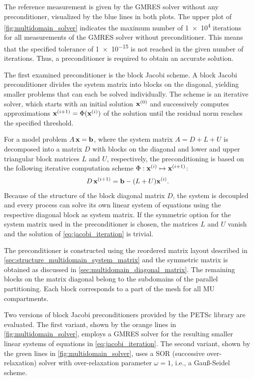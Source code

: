 The reference measurement is given by the GMRES solver without any preconditioner, visualized by the blue lines in both plots.
The upper plot of \cref{fig:multidomain_solver} indicates the maximum number of \num{1e4} iterations for all measurements of the GMRES solver without preconditioner. This means that the specified tolerance of \num{1e-15} is not reached in the given number of iterations. Thus, a preconditioner is required to obtain an accurate solution.

The first examined preconditioner is the block Jacobi scheme.
A block Jacobi preconditioner divides the system matrix into blocks on the diagonal, yielding smaller problems that can each be solved individually.
The scheme is an iterative solver, which starts with an initial solution $\textbf{x}^{(0)}$ and successively computes  approximations $\textbf{x}^{(i+1)} = \Phi(\textbf{x}^{(i)})$ of the solution until the residual norm reaches the specified threshold.

For a model problem $A\,\textbf{x} = \textbf{b}$, where the system matrix $A=D+L+U$ is decomposed into a matrix $D$ with blocks on the diagonal and lower and upper triangular block matrices $L$ and $U$, respectively, the preconditioning is based on the following iterative computation scheme $\Phi: \textbf{x}^{(i)} \mapsto \textbf{x}^{(i+1)}$:
\begin{align}\label{eq:jacobi_iteration}
  D\,\textbf{x}^{(i+1)} = \textbf{b} - (L+U)\textbf{x}^{(i)}.
\end{align}
Because of the structure of the block diagonal matrix $D$, the system is decoupled and every process can solve its own linear system of equations using the respective diagonal block as system matrix. If the symmetric option for the system matrix used in the preconditioner is chosen, the matrices $L$ and $U$ vanish and the solution of \cref{eq:jacobi_iteration} is trivial.

The preconditioner is constructed using the reordered matrix layout described in \cref{sec:structure_multidomain_system_matrix} and the symmetric matrix is obtained as discussed in \cref{sec:multidomain_diagonal_matrix}. The remaining blocks on the matrix diagonal belong to the subdomains of the parallel partitioning. Each block corresponds to a part of the mesh for all MU compartments.

Two versions of block Jacobi preconditioners provided by the PETSc library are evaluated.
The first variant, shown by the orange lines in \cref{fig:multidomain_solver}, employs a GMRES solver for the resulting smaller linear systems of equations in \cref{eq:jacobi_iteration}.
The second variant, shown by the green lines in \cref{fig:multidomain_solver}, uses a SOR (successive over-relaxation) solver with over-relaxation parameter 
$\omega=1$, i.e., a Gauß-Seidel scheme.

